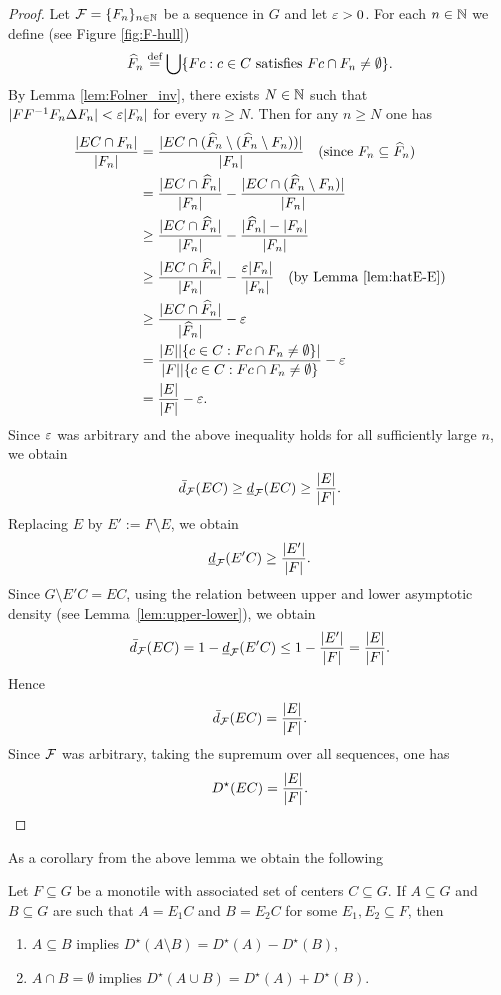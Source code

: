 \begin{proof} 
Let $\operatorname{\mathcal{F}}=\{F_n\}_{n\in\mathbb{N}}$ be a \Folner sequence in $G$ and let $\varepsilon>0$. For each $n\in\mathbb{N}$ we define (see Figure \ref{fig:F-hull})
\[
\widehat F_n\stackrel{\textup{def}}{=}\bigcup\{Fc:c\in C \text{ satisfies } Fc\cap F_n\neq\emptyset\}.
\]
By Lemma \ref{lem:Folner_inv}, there exists $N\in\mathbb{N}$ such that $|FF^{-1}F_n\Delta F_n|<\varepsilon|F_n|$ for every $n\geq N$. Then for any $n\geq N$ one has
\begin{align}
\frac{|EC\cap F_n|}{|F_n|}
&=\frac{|EC\cap(\widehat F_n\setminus(\widehat F_n\setminus F_n))|}{\left|F_n\right|} \quad\mbox{(since  $F_n\subseteq \widehat F_n$)} \nonumber\\
&= \frac{|EC\cap\widehat F_n|}{|F_n|}-\frac{|EC\cap (\widehat F_n \setminus F_n)|}{|F_n|} \nonumber\\ 
&\geq\frac{|EC\cap \widehat F_n|}{|F_n|} - \frac{|\widehat F_n|-|F_n|}{|F_n|} \nonumber\\
&\geq \frac{|EC\cap \widehat F_n|}{|F_n|} - \frac{\varepsilon|F_n|}{|F_n|} \quad\text{(by Lemma \ref{lem:hatE-E})} \label{eq:EC}\\
&\geq \frac{|EC\cap \widehat F_n|}{|\widehat F_n|} - \varepsilon \nonumber\\
&=\frac{|E||\{c\in C: Fc\cap F_n\neq\emptyset\}|}{|F||\{c\in C: Fc\cap F_n\neq\emptyset\}}-\varepsilon \nonumber\\
&= \frac{|E|}{|F|}-\varepsilon. \nonumber
\end{align}
Since $\varepsilon$ was arbitrary and the above inequality holds for all sufficiently large $n$, we obtain 
\[
\bar{d}_{\operatorname{\mathcal{F}}}(EC)\geq \underline{d}_{\operatorname{\mathcal{F}}}(EC)\geq \frac{|E|}{|F|}.
\] 
Replacing $E$ by $E':=F\setminus E$, we obtain
\[
\underline{d}_{\operatorname{\mathcal{F}}}(E'C)\geq \frac{|E'|}{|F|}.
\]  
Since $G\setminus E'C = EC$, using the relation between upper and lower asymptotic density (see Lemma~\ref{lem:upper-lower}), we obtain
\[
\bar{d}_{\operatorname{\mathcal{F}}}(EC)=1-\underline{d}_{\operatorname{\mathcal{F}}}(E'C)\leq 1 - \frac{|E'|}{|F|} = \frac{|E|}{|F|}. 
\]
Hence 
\[
\bar{d}_{\operatorname{\mathcal{F}}}(EC)=\frac{|E|}{|F|}.
\]
Since $\operatorname{\mathcal{F}}$ was arbitrary, taking the supremum over all \Folner sequences, one has
\[
D^\star(EC)= \frac{|E|}{|F|}. \qedhere
\]
\end{proof}
\noindent 
As a corollary from the above lemma we obtain the following 
\begin{lem}\label{lem:Dstar_properties}
Let $F\subseteq G$ be a monotile with associated set of centers $C\subseteq G$.
If $A\subseteq G$ and $B\subseteq G$ are such that $A=E_1C$ and $B=E_2C$ for some $E_1,E_2\subseteq F$, then
\begin{enumerate}
\item $A\subseteq B$ implies $D^\star(A\setminus B)= D^\star(A)-D^\star(B)$,
\item  $A\cap B=\emptyset$ implies $D^\star(A\cup B)= D^\star(A)+D^\star(B)$.
\end{enumerate}
\end{lem}

